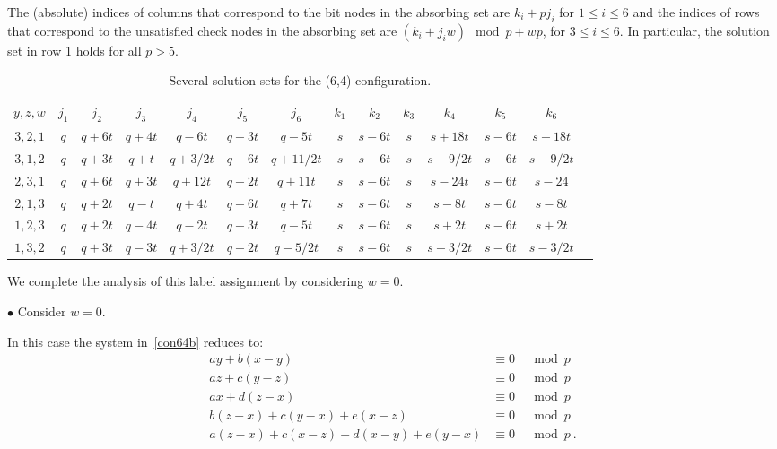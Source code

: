 {The (absolute) indices of columns that correspond to the bit nodes
in the absorbing set are $k_i+pj_i$ for $1 \leq i \leq 6$ and the
indices of rows that correspond to the unsatisfied check nodes in
the absorbing set are $(k_i+j_iw) \mod p+ wp$, for $3\leq i \leq 6$.
In particular, the solution set in row 1 holds for all $p > 5$.

\hspace{-0.95in}\small{\hspace{-0.95in}\begin{table}[ht]\vspace{-0.05in}\hspace{-0.95in}
\begin{tabular}{|c |c|c|c|c|c|c|c|c|c|c|c|c|c|}
  \hline
  $y,z,w$ & $j_1$ & $j_2$ & $j_3$ & $j_4$ & $j_5$ & $j_6$ & $k_1$ & $k_2$ & $k_3$ & $k_4$ & $k_5$ & $k_6$ \\
  \hline
$3,2,1$&  $q$ & $q+6t$ &  $q+4t$ &  $q-6t$ &  $q+3t$ & $q-5t$ & $s$
& $s-6t$ & $s$ & $s+18t$ & $s-6t$ &
  $s+18t$\\
  $3,1,2$&$q$& $q+3t$ &  $q+t$ &    $q+3/2t$ &  $q+6t$ &   $q+11/2t$ & $s$ & $s-6t$ & $s$ & $s-9/2t$ & $s-6t$ &
  $s-9/2t$\\
 $2,3,1$& $q$ & $q+6t$ &  $q+3t$&    $q+12t$ &  $q+2t$ &   $q+11t$ & $s$ & $s-6t$ & $s$ & $s-24t$ & $s-6t$ &
  $s-24$\\
$2,1,3$&  $q$ & $q+2t$ &  $q-t$ &  $q+4t$ &   $q+6t$ &    $q+7t$ &
$s$ & $s-6t$ & $s$ & $s-8t$ & $s-6t$ &
  $s-8t$\\
 $1,2,3$& $q$ & $q+2t$ &  $q-4t$ &    $q-2t$ &    $q+3t$ &    $q-5t$ & $s$ & $s-6t$ & $s$ & $s+2t$ & $s-6t$ &
  $s+2t$\\
  $1,3,2$&$q$ & $q+3t$ &  $q-3t$ &    $q+3/2t$ &  $q+2t$ &   $q-5/2t$ & $s$ & $s-6t$ & $s$ & $s-3/2t$ & $s-6t$ &
  $s-3/2t$\\
  \hline
\end{tabular}
\caption{ Several solution sets for the (6,4)
configuration.}\label{table64}
\end{table}}
\normalsize }

We complete the analysis of this label assignment by considering
$w=0$.

$\bullet$ Consider $w=0$.



In this case the system in~\eqref{con64b} reduces to:
 \begin{equation}\label{sys31a}\begin{array}{ccccc}
 ay+b(x-y) &\equiv 0 &\mod p\\
 az+c(y-z)  &\equiv 0 &\mod p\\
 ax+d(z-x) &\equiv 0 &\mod p\\
 b(z-x)+c(y-x)+e(x-z) &\equiv 0 &\mod p\\
 a(z-x)+c(x-z)+d(x-y)+e(y-x) &\equiv 0 &\mod p~.
 \end{array}
 \end{equation}


